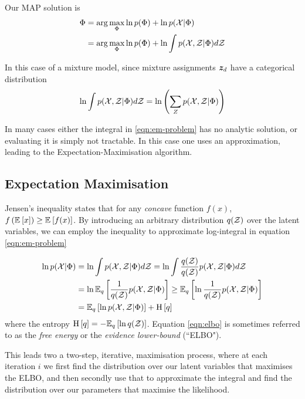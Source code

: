 Our MAP solution is
\begin{align}
\begin{split}
\params 
    &= \arg \max_\params \ln p(\params) + \ln p(\xdat|\params) \\
    &= \arg \max_\params \ln p(\params) + \ln \int \joint d\zdat \label{eqn:em-problem}
\end{split}
\end{align}

In this case of a mixture model, since mixture assignments $\vv{z}_d$ have a categorical distribution
\begin{align}
\ln \int \joint d\zdat = \ln \left(\sum_Z \joint\right)
\end{align}

In many cases either the integral in \eqref{eqn:em-problem} has no analytic solution, or evaluating it is simply not tractable. In this case one uses an approximation, leading to the Expectation-Maximisation algorithm.
\subsection{Expectation Maximisation}
Jensen's inequality states that for any \emph{concave} function $f(x)$, $f\left(\ex{x}{}\right) \geq \ex{f(x)}{}$. By introducing an arbitrary distribution $q(\zdat)$ over the latent variables, we can employ the inequality to approximate log-integral in equation \eqref{eqn:em-problem}

\begin{align}
 \ln p(\xdat|\params) & = \ln \int \joint d\zdat =  \ln \int \frac{q(\zdat)}{q(\zdat)} \joint d\zdat\\ 
     &=  \ln \ex{\oneover{q(\zdat)}\joint}{q} \geq  \ex{\ln \oneover{q(\zdat)}\joint}{q}\\
     &= \ex{\ln \joint}{q} + \ent{q} \label{eqn:elbo}
\end{align}
where the entropy $\ent{q} = -\ex{\ln q(\zdat)}{q}$. Equation \eqref{eqn:elbo} is sometimes referred to as the \emph{free energy} or the \emph{evidence lower-bound} (``ELBO").

This leads two a two-step, iterative, maximisation process, where at each iteration $i$ we first find the distribution over our latent variables that maximises the ELBO, and then secondly use that to approximate the integral and find the distribution over our parameters that maximise the likelihood.

